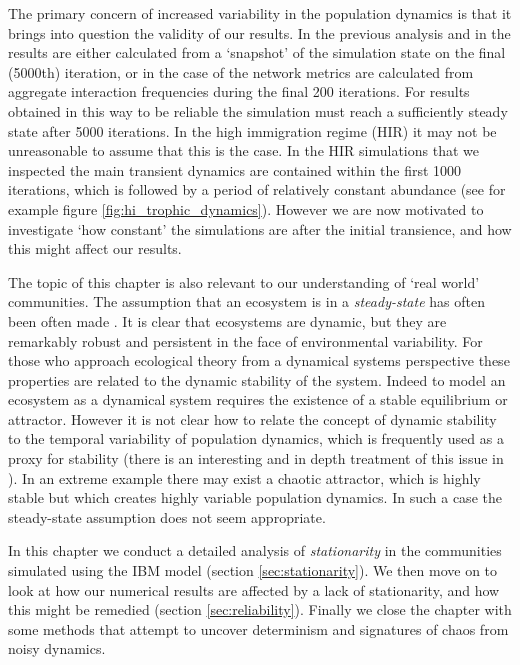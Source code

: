 The primary concern of increased variability in the population dynamics is that it brings into question the validity of our results. In the previous analysis and in \cite{lurgi2015effects} the results are either calculated from a `snapshot' of the simulation state on the final (5000th) iteration, or in the case of the network metrics are calculated from aggregate interaction frequencies during the final 200 iterations. For results obtained in this way to be reliable the simulation must reach a sufficiently steady state after 5000 iterations. In the high immigration regime (HIR) it may not be unreasonable to assume that this is the case. In the HIR simulations that we inspected the main transient dynamics are contained within the first 1000 iterations, which is followed by a period of relatively constant abundance (see for example figure \ref{fig:hi_trophic_dynamics}). However we are now motivated to investigate `how constant' the simulations are after the initial transience, and how this might affect our results.  

The topic of this chapter is also relevant to our understanding of `real world' communities. The assumption that an ecosystem is in a \emph{steady-state} has often been often made \cite{brock1967ecosystem}. It is clear that ecosystems are dynamic, but they are remarkably robust and persistent in the face of environmental variability. For those who approach ecological theory from a dynamical systems perspective these properties are related to the dynamic stability of the system. Indeed to model an ecosystem as a dynamical system requires the existence of a stable equilibrium or attractor. However it is not clear how to relate the concept of dynamic stability to the temporal variability of population dynamics, which is frequently used as a proxy for stability (there is an interesting and in depth treatment of this issue in \cite{arnoldi2015}). In an extreme example there may exist a chaotic attractor, which is highly stable but which creates highly variable population dynamics. In such a case the steady-state assumption does not seem appropriate. 

In this chapter we conduct a detailed analysis of \emph{stationarity} in the communities simulated using the IBM model (section \ref{sec:stationarity}). We then move on to look at how our numerical results are affected by a lack of stationarity, and how this might be remedied (section \ref{sec:reliability}). Finally we close the chapter with some methods that attempt to uncover determinism and signatures of chaos from noisy dynamics.

